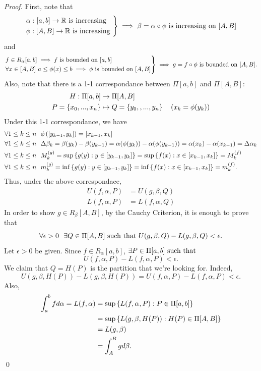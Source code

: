 \begin{proof}
    First, note that
    $$\begin{rcases*}
        \alpha:[a,b] \to \R \text{ is increasing } \\
        \phi: [A,B] \to \R \text{ is increasing }
    \end{rcases*} \implies \beta = \alpha \circ \phi \text{ is increasing on }[A,B]$$
    and
    $$\begin{rcases*}
        f \in R_\alpha[a,b] \implies f \text{ is bounded on } [a,b] \\
        \forall x \in [A,B] ~a \leq \phi(x) \leq b \implies \phi \text{ is bounded on } [A,B]
    \end{rcases*} \implies g = f\circ \phi \text{ is bounded on } [A,B].$$
    Also, note that there is a 1-1 correspondance between $\Pi[a,b]$ and $\Pi[A,B]$:
    \begin{align*}
        H: \Pi[a,b] &\to \Pi[A,B] \\
        P = \left\{x_0, ..., x_n\right\} &\mapsto Q = \left\{y_0,, ..., y_n\right\} ~~~(x_k = \phi(y_k))
    \end{align*}
    Under this 1-1 correspondance, we have 
    \begin{align*}
        \forall 1 \leq k \leq n& ~~\phi\left([y_{k-1}, y_k]\right) = [x_{k-1}, x_k] \\ 
        \forall 1 \leq k \leq n& ~~\Delta \beta_k = \beta(y_k) - \beta(y_{k-1}) = \alpha(\phi(y_k)) - \alpha(\phi(y_{k-1})) = \alpha(x_k) - \alpha(x_{k-1}) = \Delta \alpha_k \\
        \forall 1 \leq k \leq n& ~~M^{(g)}_k = \sup\left\{g(y) : y \in [y_{k-1}, y_k]\right\} = \sup\left\{f(x) : x \in [x_{k-1}, x_k]\right\} = M^{(f)}_k \\
        \forall 1 \leq k \leq n& ~~m^{(g)}_k = \inf \left\{g(y) : y \in [y_{k-1}, y_k]\right\} = \inf \left\{f(x) : x \in [x_{k-1}, x_k]\right\} = m^{(f)}_k.
    \end{align*}
    Thus, under the above correspondace,
    \begin{align*}
        U(f, \alpha, P) &= U(g, \beta, Q) \\
        L(f, \alpha, P) &= L(f, \alpha, Q)
    \end{align*}
    In order to show $g \in R_\beta[A,B]$, by the Cauchy Criterion, it is enough to prove that
    $$\forall \epsilon > 0 ~~\exists Q \in \Pi[A,B] \text{ such that } U(g, \beta, Q) - L(g, \beta, Q) < \epsilon.$$
    Let $\epsilon > 0$ be given. Since $f \in R_\alpha[a,b]$, $\exists P \in \Pi[a,b] \text{ such that }$
    $$U(f, \alpha, P) - L(f, \alpha, P) < \epsilon.$$
    We claim that $Q = H(P)$ is the partition that we're looking for. Indeed,
    $$U(g, \beta, H(P)) - L(g, \beta, H(P)) = U(f, \alpha, P) - L(f, \alpha, P) < \epsilon.$$
    Also,
    \begin{align*}
        \int_a^b f d\alpha = L(f, \alpha) &= \sup\left\{L(f, \alpha, P) : P \in \Pi[a,b]\right\} \\ 
        &= \sup \left\{L(g, \beta, H(P)) : H(P) \in \Pi[A,B]\right\} \\ 
        &= L(g, \beta) \\
        &= \int_A^Bg d\beta.
    \end{align*}
    \qed
\end{proof}

